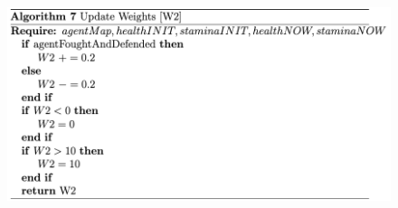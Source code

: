 

\begin{figure}[htb]
    \centering
    \includegraphics[scale=0.7]{006_team_3_agent_design/FIGS/Algo7.png}
    \label{fig:algo7}
\end{figure}


